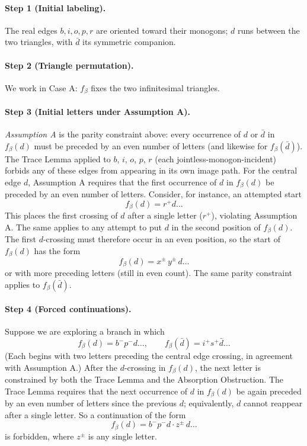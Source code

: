 \paragraph{Step 1 (Initial labeling).} The real edges $b, i, o, p, r$ are oriented toward their monogons; $d$ runs between the two triangles, with $\bar{d}$ its symmetric companion.

\paragraph{Step 2 (Triangle permutation).} We work in Case A: $f_\beta$ fixes the two infinitesimal triangles.

\paragraph{Step 3 (Initial letters under Assumption A).} \emph{Assumption A} is the parity constraint above: every occurrence of $d$ or $\bar{d}$ in $f_\beta(d)$ must be preceded by an even number of letters (and likewise for $f_\beta(\bar{d})$). The Trace Lemma applied to $b$, $i$, $o$, $p$, $r$ (each jointless-monogon-incident) forbids any of these edges from appearing in its own image path. For the central edge $d$, Assumption A requires that the first occurrence of $d$ in $f_\beta(d)$ be preceded by an even number of letters. Consider, for instance, an attempted start
\[
f_\beta(d) = r^+ d \ldots
\]
This places the first crossing of $d$ after a single letter ($r^+$), violating Assumption A. The same applies to any attempt to put $d$ in the second position of $f_\beta(d)$. The first $d$-crossing must therefore occur in an even position, so the start of $f_\beta(d)$ has the form
\[
f_\beta(d) = x^{\pm}\, y^{\pm}\, d \ldots
\]
or with more preceding letters (still in even count). The same parity constraint applies to $f_\beta(\bar{d})$.

\paragraph{Step 4 (Forced continuations).} Suppose we are exploring a branch in which
\[
f_\beta(d) = b^- p^- d \ldots, \qquad f_\beta(\bar{d}) = i^+ s^+ \bar{d} \ldots
\]
(Each begins with two letters preceding the central edge crossing, in agreement with Assumption A.) After the $d$-crossing in $f_\beta(d)$, the next letter is constrained by both the Trace Lemma and the Absorption Obstruction. The Trace Lemma requires that the next occurrence of $d$ in $f_\beta(d)$ be again preceded by an even number of letters since the previous $d$; equivalently, $d$ cannot reappear after a single letter. So a continuation of the form
\[
f_\beta(d) = b^- p^- d \cdot z^{\pm}\, d \ldots
\]
is forbidden, where $z^{\pm}$ is any single letter.

